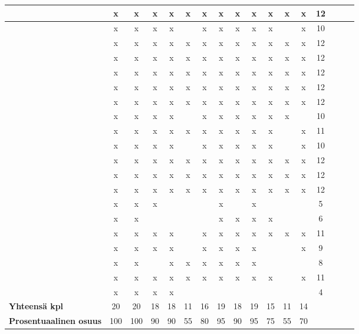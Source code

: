 \documentclass[utf8]{gradu3}
\begin{document}
\begin{scriptsize}
\begin{longtable}[c]{| l | c | c | c | c | c | c | c | c | c | c | c | c | c | c | c | c |}
\textcite{rodeghero-ym-2021} & x & x & x & x & x & x & x & x & x & x & x & x & 12\\ \hline
\textcite{azanza-ym-2021} & x & x & x & x &   & x & x & x & x & x &   & x & 10\\ \hline
\textcite{ju-ym-2021} & x & x & x & x & x & x & x & x & x & x & x & x & 12\\ \hline
\textcite{britto-ym-2020} & x & x & x & x & x & x & x & x & x & x & x & x & 12\\ \hline
\textcite{yates-ym-2020} & x & x & x & x & x & x & x & x & x & x & x & x & 12\\ \hline
\textcite{moe-ym-2020} & x & x & x & x & x & x & x & x & x & x & x & x & 12\\ \hline
\textcite{kumar-wallace-2019} & x & x & x & x & x & x & x & x & x & x & x & x & 12\\ \hline
\textcite{viviani-murphy-2019} & x & x & x & x &   & x & x & x & x & x & x &   & 10\\ \hline
\textcite{buchan-ym-2019} & x & x & x & x & x & x & x & x & x & x &   & x & 11\\ \hline
\textcite{tuzun-ym-2018} & x & x & x & x &   & x & x & x & x & x &   & x & 10\\ \hline
\textcite{matturro-ym-2017} & x & x & x & x & x & x & x & x & x & x & x & x & 12\\ \hline
\textcite{britto-ym-2017} & x & x & x & x & x & x & x & x & x & x & x & x & 12\\ \hline
\textcite{pham-ym-2017} & x & x & x & x & x & x & x & x & x & x & x & x & 12\\ \hline
\textcite{kumar-ym-2016} & x & x & x &   &   &   & x &   & x &   &   &   & 5\\ \hline
\textcite{shannon-pool-2016} & x & x &   &   &   &   & x & x & x & x &   &   & 6\\ \hline
\textcite{viana-ym-2014} & x & x & x & x &   & x & x & x & x & x & x & x & 11\\ \hline
\textcite{hemphill-begel-2011} & x & x & x & x &   & x & x & x & x &   &   & x & 9\\ \hline
\textcite{kulkarni-ym-2010} & x & x &   & x & x & x & x & x & x &   &   &   & 8\\ \hline
\textcite{johnson-senges-2010} & x & x & x & x & x & x & x & x & x & x &   & x & 11\\ \hline
\textcite{bjornson-dingsøyr-2005} & x & x & x & x &   &   &   &   &   &   &   &   & 4\\
\hline
\hline
\textbf{Yhteensä kpl} & 20 & 20 & 18 & 18 & 11 & 16 & 19 & 18 & 19 & 15 & 11 & 14 & \\
\hline
\textbf{Prosentuaalinen osuus} & 100  & 100 & 90 & 90 & 55 & 80 & 95 & 90 & 95 & 75 & 55 & 70 & \\
 
\end{longtable}
\end{scriptsize}
\end{document}
